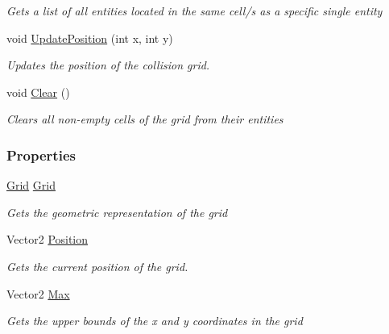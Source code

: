 \begin{DoxyCompactItemize}
\begin{DoxyCompactList}\small\item\em Gets a list of all entities located in the same cell/s as a specific single entity \end{DoxyCompactList}\item 
void \hyperlink{class_m_b2_d_1_1_collision_1_1_collision_map_a8f34c934947ce25d7de681fc07f14e09}{Update\+Position} (int x, int y)
\begin{DoxyCompactList}\small\item\em Updates the position of the collision grid. \end{DoxyCompactList}\item 
void \hyperlink{class_m_b2_d_1_1_collision_1_1_collision_map_ac7eeef6db2deadf738ea40ff939759ff}{Clear} ()
\begin{DoxyCompactList}\small\item\em Clears all non-\/empty cells of the grid from their entities \end{DoxyCompactList}\end{DoxyCompactItemize}
\subsubsection*{Properties}
\begin{DoxyCompactItemize}
\item 
\hyperlink{class_m_b2_d_1_1_geometry_1_1_grid}{Grid} \hyperlink{class_m_b2_d_1_1_collision_1_1_collision_map_aacfa35801f16fad4ea0d128edf522095}{Grid}
\begin{DoxyCompactList}\small\item\em Gets the geometric representation of the grid \end{DoxyCompactList}\item 
Vector2 \hyperlink{class_m_b2_d_1_1_collision_1_1_collision_map_a0d069be50f64db9f09d488dc2642ee48}{Position}
\begin{DoxyCompactList}\small\item\em Gets the current position of the grid. \end{DoxyCompactList}\item 
Vector2 \hyperlink{class_m_b2_d_1_1_collision_1_1_collision_map_a707dab6ca65cfe316c248976a0d750f6}{Max}
\begin{DoxyCompactList}\small\item\em Gets the upper bounds of the x and y coordinates in the grid \end{DoxyCompactList}\end{DoxyCompactItemize}


